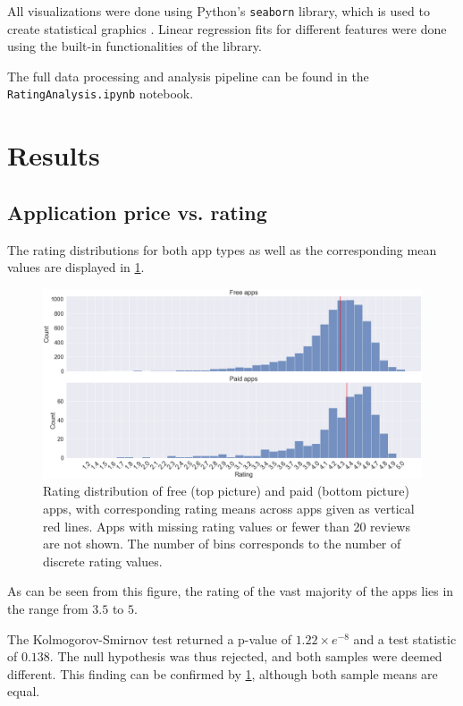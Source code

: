 \documentclass{article}
\begin{document}
All visualizations were done using Python's \verb+seaborn+ library, which is used to create statistical graphics \cite{seaborn}. Linear regression fits for different features were done using the built-in functionalities of the library.

The full data processing and analysis pipeline can be found in the \verb+RatingAnalysis.ipynb+ notebook.

\section{Results}

\subsection{Application price vs. rating}
\label{pricerating}
The rating distributions for both app types as well as the corresponding mean values are displayed in \cref{fig1}.

\begin{figure}[h]
    \centering
    \includegraphics[scale=0.27]{figures/rating_distr.png}
    \caption{Rating distribution of free (top picture) and paid (bottom picture) apps, with corresponding rating means across apps given as vertical red lines. Apps with missing rating values or fewer than 20 reviews are not shown. The number of bins corresponds to the number of discrete rating values.}
    \label{fig1}
\end{figure}

As can be seen from this figure, the rating of the vast majority of the apps lies in the range from $3.5$ to $5$.

The Kolmogorov-Smirnov test returned a p-value of $1.22\times e^{-8}$ and a test statistic of $0.138$. The null hypothesis was thus rejected, and both samples were deemed different. This finding can be confirmed by \cref{fig1}, although both sample means are equal.
\end{document}

